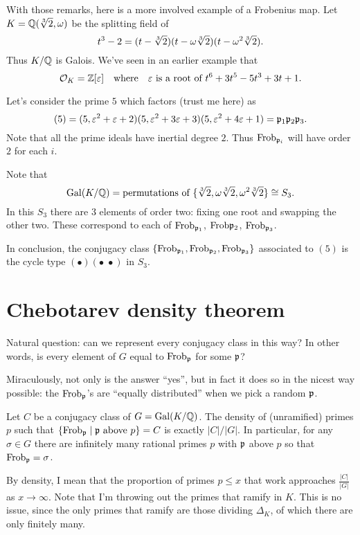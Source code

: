 \begin{example}
	With those remarks, here is a more involved example of a Frobenius map.
	Let $K = \mathbb Q(\sqrt[3]{2}, \omega)$ be the splitting field of 
	\[ t^3-2 = (t-\sqrt[3]{2})(t-\omega\sqrt[3]{2})(t-\omega^2\sqrt[3]{2}). \]
	Thus $K/\mathbb Q$ is Galois.
	We've seen in an earlier example that
	\[ \mathcal O_K = \mathbb Z[\varepsilon] \quad\text{where}\quad \varepsilon \text { is a root of } t^6+3t^5-5t^3+3t+1. \]

	Let's consider the prime $5$ which factors (trust me here) as
	\[ (5) = (5, \varepsilon^2+\varepsilon+2)(5, \varepsilon^2+3\varepsilon+3)(5, \varepsilon^2+4\varepsilon+1)
		= \mathfrak p_1 \mathfrak p_2 \mathfrak p_3. \]
	Note that all the prime ideals have inertial degree $2$.
	Thus $\mathrm{Frob}_{\mathfrak p_i}$ will have order $2$ for each $i$.

	Note that 
	\[ \operatorname{Gal}(K/\mathbb Q) =
		\text{permutations of } \{\sqrt[3]{2},\omega\sqrt[3]{2},\omega^2\sqrt[3]{2}\}
		\cong S_3.  \]
	In this $S_3$ there are $3$ elements of order two:
	fixing one root and swapping the other two.
	These correspond to each of $\mathrm{Frob}_{\mathfrak p_1}$, $\mathrm{Frob}{\mathfrak p_2}$, $\mathrm{Frob}_{\mathfrak p_3}$.

	In conclusion, the conjugacy class
	$\left\{ \mathrm{Frob}_{\mathfrak p_1}, \mathrm{Frob}_{\mathfrak p_2}, \mathrm{Frob}_{\mathfrak p_3} \right\}$
	associated to $(5)$ is the
	cycle type $(\bullet)(\bullet \; \bullet)$ in $S_3$.
\end{example}


\section{Chebotarev density theorem}
Natural question: can we represent every conjugacy class in this way?
In other words, is every element of $G$ equal to $\mathrm{Frob}_\mathfrak p$ for some $\mathfrak p$?

Miraculously, not only is the answer ``yes'', but in fact it does so in the nicest way possible:
the $\mathrm{Frob}_\mathfrak p$'s are ``equally distributed'' when we pick a random $\mathfrak p$.
\begin{theorem}
	Let $C$ be a conjugacy class of $G = \operatorname{Gal}(K/\mathbb Q)$.
	The density of (unramified) primes $p$ such that $\{ \mathrm{Frob}_\mathfrak p \mid \mathfrak p \text{ above } p \} = C$
	is exactly $\left\lvert C \right\rvert / \left\lvert G \right\rvert$.
	In particular, for any $\sigma \in G$ there are infinitely many rational primes $p$
	with $\mathfrak p$ above $p$ so that $\mathrm{Frob}_{\mathfrak p} = \sigma$.
\end{theorem}

By density, I mean that the proportion of primes $p \le x$ that work 
approaches $\frac{\left\lvert C \right\rvert}{\left\lvert G \right\rvert}$ as $x \to \infty$.
Note that I'm throwing out the primes that ramify in $K$.
This is no issue, since the only primes that ramify are those dividing $\Delta_K$,
of which there are only finitely many.

